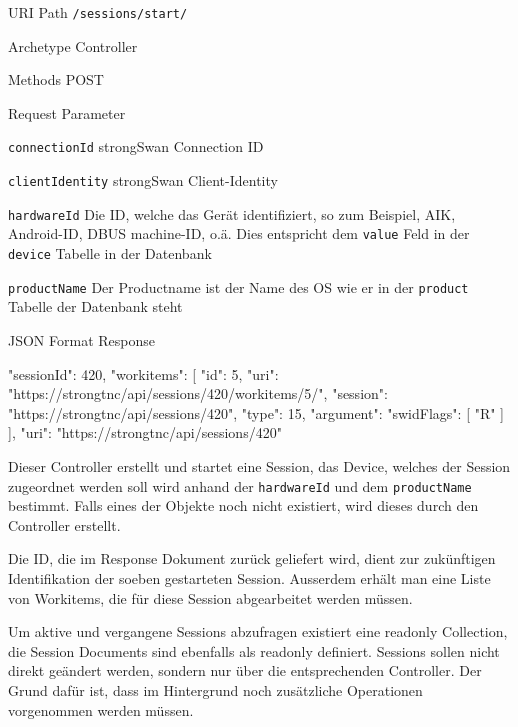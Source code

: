 \begin{mdframed}[style=def]
\begin{description*}
	\item[URI Path] \texttt{/sessions/start/}
	\item[Archetype] Controller
	\item[Methods] POST
	\item[Request Parameter] \hfill
	\begin{description*}
		\item[\texttt{connectionId}] strongSwan Connection ID
		\item[\texttt{clientIdentity}] strongSwan Client-Identity
		\item[\texttt{hardwareId}] Die ID, welche das Gerät identifiziert, so zum
		Beispiel, AIK, Android-ID, DBUS machine-ID, o.ä. Dies entspricht dem
		\texttt{value} Feld in der \texttt{device} Tabelle in der Datenbank
		\item[\texttt{productName}] Der Productname ist der Name des OS wie er in der
		\texttt{product} Tabelle der Datenbank steht
	\end{description*}
	\item[JSON Format Response] \hfill
\begin{jsoncode}
{
	"sessionId": 420,
	"workitems": [
		 {
		 	"id": 5,
		 	"uri": "https://strongtnc/api/sessions/420/workitems/5/",
		 	"session": "https://strongtnc/api/sessions/420",
		 	"type": 15,
		 	"argument": {
		 		"swidFlags": [
		 			"R"
		 		]
		 	}
		 }
	],
	"uri": "https://strongtnc/api/sessions/420"
}
\end{jsoncode}
\end{description*}
\end{mdframed}
Dieser Controller erstellt und startet eine Session, das Device, welches der
Session zugeordnet werden soll wird anhand der \texttt{hardwareId} und dem
\texttt{productName} bestimmt. Falls eines der Objekte noch nicht existiert, wird
dieses durch den Controller erstellt.

Die ID, die im Response Dokument zurück geliefert wird, dient zur zukünftigen
Identifikation der soeben gestarteten Session. Ausserdem erhält man eine Liste
von Workitems, die für diese Session abgearbeitet werden müssen.

Um aktive und vergangene Sessions abzufragen existiert eine readonly
Collection, die Session Documents sind ebenfalls als readonly definiert.
Sessions sollen nicht direkt geändert werden, sondern nur über die
entsprechenden Controller. Der Grund dafür ist, dass im Hintergrund noch
zusätzliche Operationen vorgenommen werden müssen.

